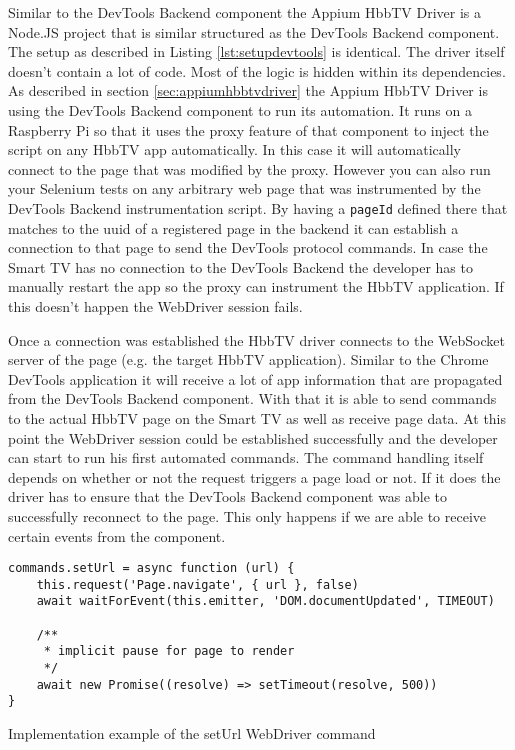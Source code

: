 Similar to the DevTools Backend component the Appium HbbTV Driver is a Node.JS project that is similar structured as the DevTools Backend component. The setup as described in Listing \ref{lst:setupdevtools} is identical. The driver itself doesn't contain a lot of code. Most of the logic is hidden within its dependencies. As described in section \ref{sec:appiumhbbtvdriver} the Appium HbbTV Driver is using the DevTools Backend component to run its automation. It runs on a Raspberry Pi so that it uses the proxy feature of that component to inject the script on any HbbTV app automatically. In this case it will automatically connect to the page that was modified by the proxy. However you can also run your Selenium tests on any arbitrary web page that was instrumented by the DevTools Backend instrumentation script. By having a \texttt{pageId} defined there that matches to the uuid of a registered page in the backend it can establish a connection to that page to send the DevTools protocol commands. In case the Smart TV has no connection to the DevTools Backend the developer has to manually restart the app so the proxy can instrument the HbbTV application. If this doesn't happen the WebDriver session fails.

Once a connection was established the HbbTV driver connects to the WebSocket server of the page (e.g. the target HbbTV application). Similar to the Chrome DevTools application it will receive a lot of app information that are propagated from the DevTools Backend component. With that it is able to send commands to the actual HbbTV page on the Smart TV as well as receive page data. At this point the WebDriver session could be established successfully and the developer can start to run his first automated commands. The command handling itself depends on whether or not the request triggers a page load or not. If it does the driver has to ensure that the DevTools Backend component was able to successfully reconnect to the page. This only happens if we are able to receive certain events from the component.

\begin{listing}[H]
\begin{verbatim}
commands.setUrl = async function (url) {
    this.request('Page.navigate', { url }, false)
    await waitForEvent(this.emitter, 'DOM.documentUpdated', TIMEOUT)

    /**
     * implicit pause for page to render
     */
    await new Promise((resolve) => setTimeout(resolve, 500))
}
\end{verbatim}
\caption{Implementation example of the setUrl WebDriver command}
\label{lst:setUrl}
\end{listing}

